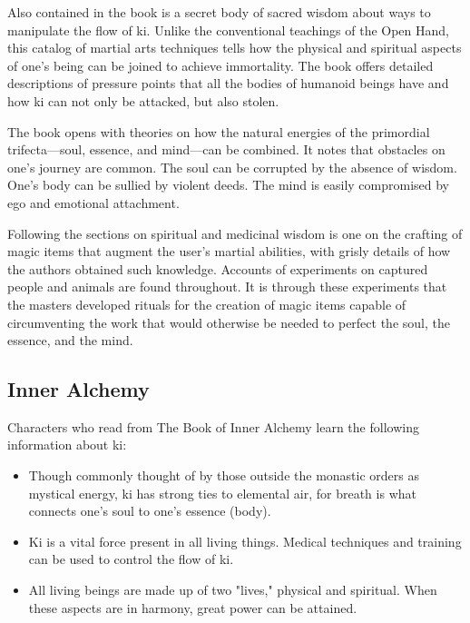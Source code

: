 \documentclass[10pt,a4paper,twoside,bg=print,twocolumn,openany,nodeprecatedcode]{dndbook}
\begin{document}
Also contained in the book is a secret body of sacred wisdom about ways to manipulate the flow of ki. Unlike the conventional teachings of the Open Hand, this catalog of martial arts techniques tells how the physical and spiritual aspects of one's being can be joined to achieve immortality. The book offers detailed descriptions of pressure points that all the bodies of humanoid beings have and how ki can not only be attacked, but also stolen.

The book opens with theories on how the natural energies of the primordial trifecta—soul, essence, and mind—can be combined. It notes that obstacles on one's journey are common. The soul can be corrupted by the absence of wisdom. One's body can be sullied by violent deeds. The mind is easily compromised by ego and emotional attachment.

Following the sections on spiritual and medicinal wisdom is one on the crafting of magic items that augment the user's martial abilities, with grisly details of how the authors obtained such knowledge. Accounts of experiments on captured people and animals are found throughout. It is through these experiments that the masters developed rituals for the creation of magic items capable of circumventing the work that would otherwise be needed to perfect the soul, the essence, and the mind.

\subsection{Inner Alchemy}
Characters who read from The Book of Inner Alchemy learn the following information about ki:


\begin{itemize}
\item Though commonly thought of by those outside the monastic orders as mystical energy, ki has strong ties to elemental air, for breath is what connects one's soul to one's essence (body).
\item Ki is a vital force present in all living things. Medical techniques and training can be used to control the flow of ki.
\item All living beings are made up of two "lives," physical and spiritual. When these aspects are in harmony, great power can be attained. 
\end{itemize}
\end{document}
